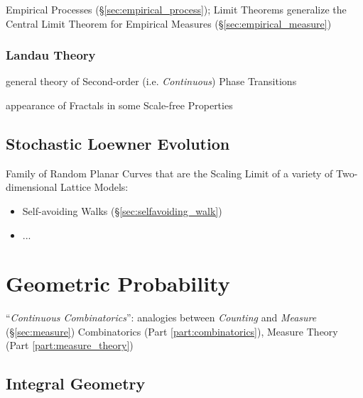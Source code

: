 \fist Empirical Processes (\S\ref{sec:empirical_process}); Limit Theorems
generalize the Central Limit Theorem for Empirical Measures
(\S\ref{sec:empirical_measure})



\subsubsection{Landau Theory}\label{sec:landau_theory}

general theory of Second-order (i.e. \emph{Continuous}) Phase Transitions

appearance of Fractals in some Scale-free Properties



\subsection{Stochastic Loewner Evolution}\label{sec:stochastic_loewner}

Family of Random Planar Curves that are the Scaling Limit of a variety of
Two-dimensional Lattice Models:
\begin{itemize}
  \item Self-avoiding Walks (\S\ref{sec:selfavoiding_walk})
  \item ...
\end{itemize}



\section{Geometric Probability}\label{sec:geometric_probability}

``\emph{Continuous Combinatorics}'': analogies between \emph{Counting} and
\emph{Measure} (\S\ref{sec:measure}) \fist Combinatorics (Part
\ref{part:combinatorics}), Measure Theory (Part \ref{part:measure_theory})



\subsection{Integral Geometry}\label{sec:integral_geometry}

